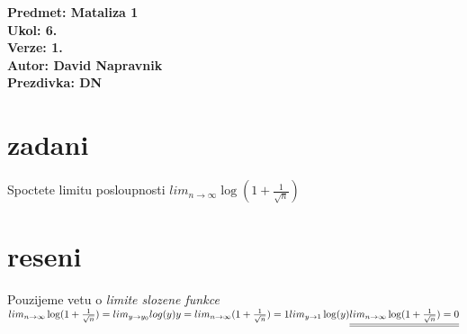 \documentclass[a4paper]{article}
\def\doubleunderline#1{\underline{\underline{#1}}}
\begin{document}
\noindent
\textbf{Predmet: Mataliza 1}\\
\textbf{Ukol: 6.}\\
\textbf{Verze: 1.}\\
\textbf{Autor: David Napravnik}\\
\textbf{Prezdivka: DN}

\section*{zadani}
Spoctete limitu posloupnosti $lim_{n \rightarrow \infty}\log(1+\frac{1}{\sqrt{n}})$

\section*{reseni}
Pouzijeme vetu o \textit{limite slozene funkce}\\
$
	lim_{n \rightarrow \infty}\log(1+\frac{1}{\sqrt{n}}) =
	lim_{y \rightarrow y_0}log(y)\\
	y = lim_{n \rightarrow \infty}(1+\frac{1}{\sqrt{n}}) = 1\\
	lim_{y \rightarrow 1}\log(y)\\
	\doubleunderline{
		lim_{n \rightarrow \infty}\log(1+\frac{1}{\sqrt{n}}) = 0
	}\\
$
\end{document}
